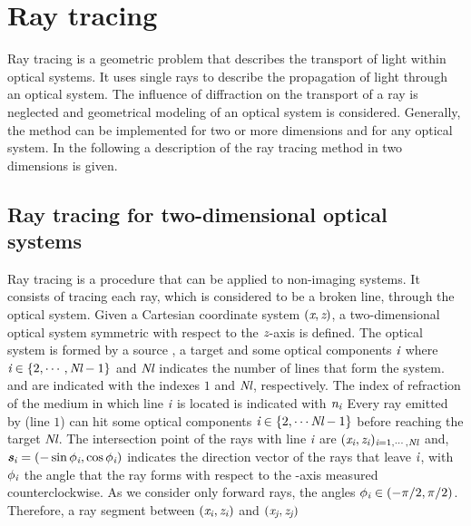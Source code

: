 \chapter{Ray tracing}\label{chap:raytracing}
Ray tracing is a geometric problem that describes the transport of light within optical systems.
It uses single rays to describe the propagation of light through an optical system.
The influence of diffraction on the transport of a ray is neglected and geometrical modeling of an optical system is considered.
Generally, the method can be implemented for two or more dimensions and for any optical system.
In the following a description of the ray tracing method  in two dimensions is given.
\section{Ray tracing for two-dimensional optical systems}
Ray tracing is a procedure that can be applied to non-imaging systems. It consists of tracing each ray, which is considered to be a broken line, through the optical system.
Given a Cartesian coordinate system $(\textit{x}, \textit{z})$, a two-dimensional optical system symmetric with respect to the $\textit{z}$-axis is defined.
The optical system is formed by a source , a target   and some optical components $\textit{i}$ where $\textit{i} \in \{2, \cdots, \textit{Nl}-1\}$ and $\textit{Nl}$
 indicates the number of lines that form the system.  and  are indicated with the indexes $1$ and $\textit{Nl}$, respectively. 
The index of refraction of the medium in which line $\textit{i}$ is located is indicated with $\textit{n}_{\textit{i}}$
Every ray emitted by  (line $1$) can hit some optical components $\textit{i}\in\{2, \cdots \textit{Nl} -1\}$ before reaching the target $\textit{Nl}$. 
The intersection point of the rays with line $\textit{i}$ are $(\textit{x}_{\textit{i}}, \textit{z}_{\textit{i}})_{\textit{i} =1, \cdots, \textit{Nl}}$ and, $\textit{\textbf{s}}_{\textit{i}}= (-\sin \phi_{\textit{i}}, \cos \phi_{\textit{i}})$ indicates the direction vector of the rays that leave $\textit{i}$,
with $\phi_{\textit{i}}$ the angle that the ray forms with respect to the -axis measured counterclockwise. As we consider only forward rays, the angles 
$\phi_{\textit{i}}\in (-\pi/2, \pi/2)$.
Therefore, a ray segment between $(\textit{x}_{\textit{i}}, \textit{z}_{\textit{i}})$ and $(\textit{x}_{\textit{j}}, \textit{z}_{\textit{j}})$ 
